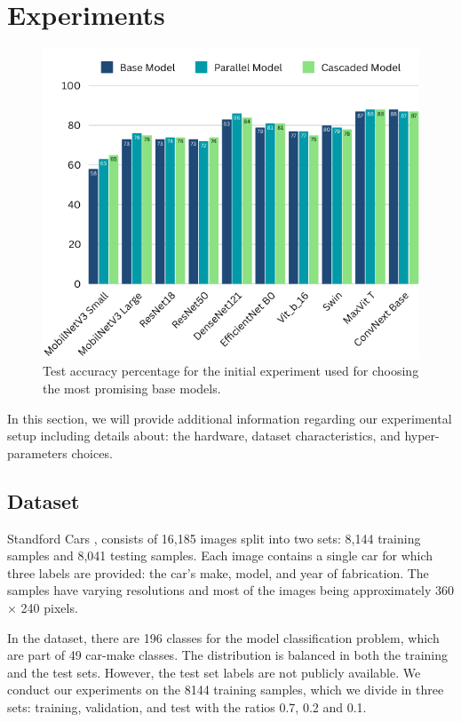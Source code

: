 \documentclass[conference]{IEEEtran}
\begin{document}
\section{Experiments}
\label{results}

\begin{figure}[hbt!]
\centering
\centerline{\includegraphics[scale=0.85]{figures/experiment0.png}}
	\caption{Test accuracy percentage for the initial experiment used for choosing the most promising base models.}
	\label{fig:experiment0}
\end{figure}

In this section, we will provide additional information regarding our experimental setup including details about: the hardware, dataset characteristics, and hyper-parameters choices. 

\subsection{Dataset}

Standford Cars \cite{krause2015fine}, consists of 16,185 images split into two sets: 8,144 training samples and 8,041 testing samples. Each image contains a single car for which three labels are provided: the car's make, model, and year of fabrication. The samples have varying resolutions and most of the images being approximately 360 × 240 pixels. 

In the dataset, there are 196 classes for the model classification problem, which are part of 49 car-make classes. The distribution is balanced in both the training and the test sets. However, the test set labels are not publicly available. We conduct our experiments on the 8144 training samples, which we divide in three sets: training, validation, and test with the ratios 0.7, 0.2 and 0.1.  
\end{document}
